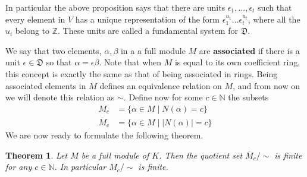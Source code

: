 \documentclass{article}
\newtheorem{theorem}{Theorem}[section]
\newcommand{\mfrak}[1]{\mathfrak{#1}}
\newcommand{\mbb}[1]{\mathbb{#1}}
\begin{document}
In particular the above proposition says that there are units $\epsilon_1, ..., \epsilon_t$ such that every element in $V$ has a unique representation of the form $\epsilon_1^{u_1}...\epsilon_t^{u_t}$, where all the $u_i$ belong to $\mbb Z$. These units are called a fundamental system for $\mfrak D$.  

We say that two elements, $\alpha,\beta$ in a a full module $M$ are \textbf{associated} if there is a unit $\epsilon \in \mfrak D$ so that $\alpha = \epsilon \beta$. Note that when $M$ is equal to its own coefficient ring, this concept is exactly the same as that of being associated in rings. Being associated elements in $M$ defines an equivalence relation on $M$, and from now on we will denote this relation as $\sim$. Define now for some $c \in \mbb N$ the subsets
\begin{align*}
    M_c &= \{ \alpha \in M \mid N(\alpha) = c\} \\
    \overline M_c &= \{ \alpha \in M \mid | N(\alpha) | = c\}
\end{align*}
We are now ready to formulate the following theorem.
\begin{theorem} 
    Let $M$ be a full module of $K$. Then the quotient set $\overline M_c / \sim$ is finite for any $c \in \mbb N$. In particular $M_c / \sim$ is finite.
\end{theorem}
\end{document}
